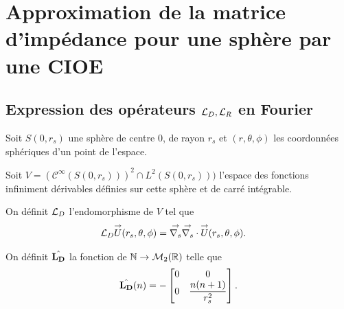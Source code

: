 \section[Approximation par une CIOE de l'opérateur de Calderon de la sphère]{Approximation de la matrice d'impédance pour une sphère par une CIOE}

  \subsection[Expression des opérateurs LD,LR en Fourier]{Expression des opérateurs \({\mathcal{L}_D},{\mathcal{L}_R}\) en Fourier}


Soit \(S(0,r_s)\) une sphère de centre 0, de rayon \(r_s\) et \((r,\theta,\phi)\) les coordonnées sphériques d'un point de l'espace.

    Soit \(V = \left(\mathcal{C}^\infty(S(0,r_s))\right)^2 \cap L^2(S(0,r_s)))\) l'espace des fonctions infiniment dérivables définies sur cette sphère et de carré intégrable.

    \begin{defn}
      \label{eq:sphere:fourier:LD}
      On définit \({\mathcal{L}_D}\) l'endomorphisme de \(V\) tel que
      \begin{align*}
        {\mathcal{L}_D} {\overset{\rightarrow}{U}}(r_s,\theta,\phi) & = {\overset{\rightarrow}{\nabla_s}}{} {\overset{\rightarrow}{\nabla_s}} \cdot{} {\overset{\rightarrow}{U}}(r_s,\theta,\phi).
      \end{align*}

      On définit \(\hat{\mathbf{L_D}}\) la fonction de \(\mathbb N \rightarrow \mathcal{M}_2(\mathbb R)\) telle que
      \begin{equation*}
        \hat{\mathbf{L_D}}(n) = -
        \begin{bmatrix}
          0 & 0
          \\
          0 & \dfrac{n(n+1)}{r_s^2}
        \end{bmatrix}.
      \end{equation*}
    \end{defn}

